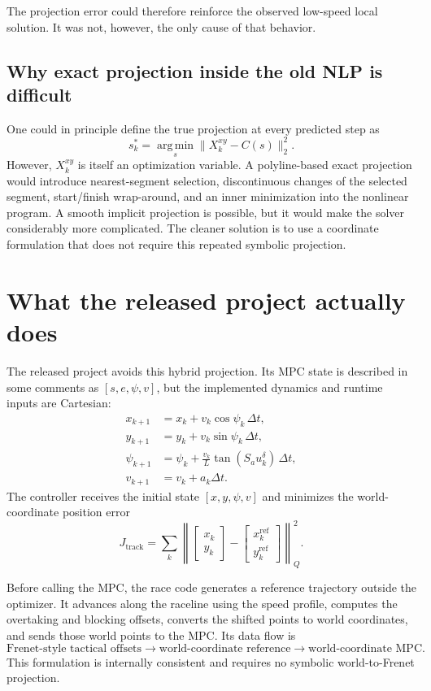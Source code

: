 \documentclass[11pt]{article}
\begin{document}
The projection error could therefore reinforce the observed low-speed local
solution. It was not, however, the only cause of that behavior.

\subsection{Why exact projection inside the old NLP is difficult}

One could in principle define the true projection at every predicted step as
\[
  s_k^*=\underset{s}{\operatorname{arg\,min}}
  \|X_k^{xy}-C(s)\|_2^2.
\]
However, $X_k^{xy}$ is itself an optimization variable. A polyline-based exact
projection would introduce nearest-segment selection, discontinuous changes of
the selected segment, start/finish wrap-around, and an inner minimization into
the nonlinear program. A smooth implicit projection is possible, but it would
make the solver considerably more complicated. The cleaner solution is to use
a coordinate formulation that does not require this repeated symbolic
projection.

\section{What the released project actually does}

The released project avoids this hybrid projection. Its MPC state is described
in some comments as $[s,e,\psi,v]$, but the implemented dynamics and runtime
inputs are Cartesian:
\[
\begin{aligned}
  x_{k+1} &= x_k+v_k\cos\psi_k\,\Delta t,\\
  y_{k+1} &= y_k+v_k\sin\psi_k\,\Delta t,\\
  \psi_{k+1}
  &=\psi_k+\frac{v_k}{L}\tan(S_a u_k^\delta)\,\Delta t,\\
  v_{k+1} &=v_k+a_k\Delta t.
\end{aligned}
\]
The controller receives the initial state $[x,y,\psi,v]$ and minimizes the
world-coordinate position error
\[
  J_{\mathrm{track}}
  =\sum_k
  \left\|
    \begin{bmatrix}x_k\\y_k\end{bmatrix}
    -
    \begin{bmatrix}x_k^{\mathrm{ref}}\\y_k^{\mathrm{ref}}\end{bmatrix}
  \right\|_Q^2.
\]

Before calling the MPC, the race code generates a reference trajectory outside
the optimizer. It advances along the raceline using the speed profile, computes
the overtaking and blocking offsets, converts the shifted points to world
coordinates, and sends those world points to the MPC. Its data flow is
\[
  \text{Frenet-style tactical offsets}
  \longrightarrow
  \text{world-coordinate reference}
  \longrightarrow
  \text{world-coordinate MPC}.
\]
This formulation is internally consistent and requires no symbolic
world-to-Frenet projection.
\end{document}
